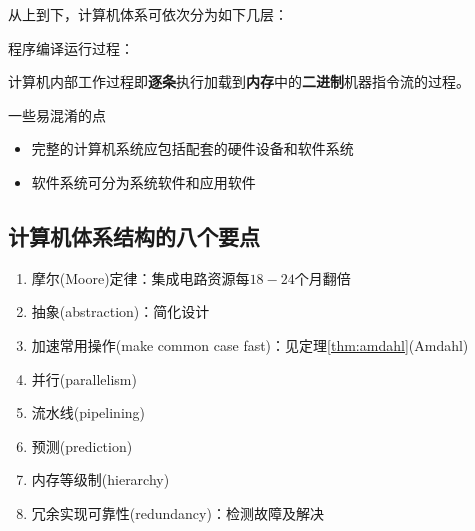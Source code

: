 从上到下，计算机体系可依次分为如下几层：
\begin{center}
\end{center}
\par 程序编译运行过程：
\begin{center}
\end{center}
\par 计算机内部工作过程即\textbf{逐条}执行加载到\textbf{内存}中的\textbf{二进制}机器指令流的过程。

一些易混淆的点
\begin{itemize}
	\item 完整的计算机系统应包括配套的硬件设备和软件系统
	\item 软件系统可分为系统软件和应用软件
\end{itemize}

\subsection{计算机体系结构的八个要点}
\begin{enumerate}
	\item 摩尔(Moore)定律：集成电路资源每$18-24$个月翻倍
	\item 抽象(abstraction)：简化设计
	\item 加速常用操作(make common case fast)：见定理\ref{thm:amdahl}(Amdahl)
	\item 并行(parallelism)
	\item 流水线(pipelining)
	\item 预测(prediction)
	\item 内存等级制(hierarchy)
	\item 冗余实现可靠性(redundancy)：检测故障及解决
\end{enumerate}

